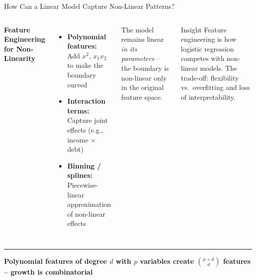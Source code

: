 \documentclass[8pt,aspectratio=169]{beamer}
\newcommand{\bottomnote}[1]{%
\vfill
\vspace{-2mm}
\textcolor{mllavender2}{\rule{\textwidth}{0.4pt}}
\vspace{1mm}
\footnotesize
\textbf{#1}
}
\newenvironment{compactlist}{%
  \begin{itemize}%
    \setlength{\itemsep}{2pt}%
    \setlength{\parskip}{0pt}%
    \setlength{\parsep}{0pt}%
}{%
  \end{itemize}%
}
\begin{document}
\begin{frame}[t]{How Can a Linear Model Capture Non-Linear Patterns?}
\begin{columns}[T]
\small
\textbf{Feature Engineering for Non-Linearity}

\begin{compactlist}
\item \textbf{Polynomial features:} Add $x^2$, $x_1 x_2$ to make the boundary curved
\item \textbf{Interaction terms:} Capture joint effects (e.g., income $\times$ debt)
\item \textbf{Binning / splines:} Piecewise-linear approximation of non-linear effects
\end{compactlist}

\vspace{1mm}
\scriptsize
The model remains linear \emph{in its parameters} -- the boundary is non-linear only in the original feature space.

\begin{block}{Insight}
\scriptsize Feature engineering is how logistic regression competes with non-linear models. The trade-off: flexibility vs.\ overfitting and loss of interpretability.
\end{block}

\end{columns}

\bottomnote{Polynomial features of degree $d$ with $p$ variables create $\binom{p+d}{d}$ features -- growth is combinatorial}
\end{frame}
\end{document}
